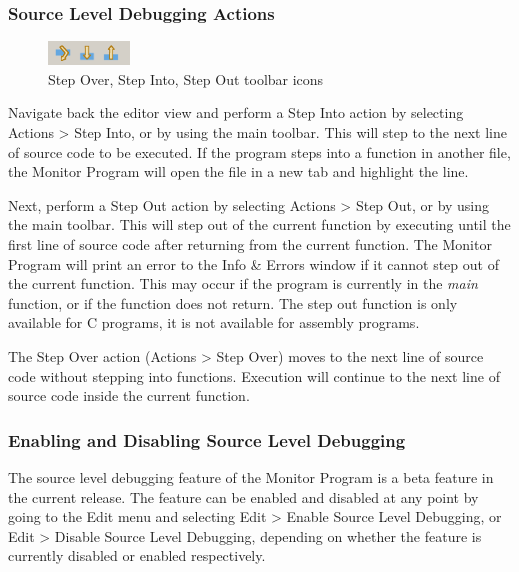 \documentclass[11pt, twoside, pdftex]{article}
\begin{document}
\subsubsection{Source Level Debugging Actions}

\begin{figure}[H]
   \begin{center}
      \includegraphics[scale=1]{screenshots/figure28.png}
   \end{center}
   \caption{Step Over, Step Into, Step Out toolbar icons}
	 \label{fig:28}
\end{figure}

Navigate back the editor view and perform a Step Into action by selecting {\sf Actions > Step Into}, or by using the main toolbar.
This will step to the next line of source code to be executed. If the program steps into a function in another file, the Monitor
Program will open the file in a new tab and highlight the line.

Next, perform a Step Out action by selecting {\sf Actions > Step Out}, or by using the main toolbar. This will step out of the current function 
by executing until the first line of source code after returning from the current function. The Monitor Program will print an error to the
{\sf Info \& Errors} window if it cannot step out of the current function. This may occur if the program is currently in the
{\it main} function, or if the function does not return. 
The step out function is only available for C programs, it is not available for assembly programs.

The Step Over action ({\sf Actions > Step Over}) moves to the next line of source code without stepping into functions. 
Execution will continue to the next line of source code inside the current function.

\subsubsection{Enabling and Disabling Source Level Debugging}
The source level debugging feature of the Monitor Program is a beta feature in the current release. The feature can be enabled and disabled at any point by going to the {\sf Edit} menu and selecting {\sf Edit > Enable Source Level Debugging}, or {\sf Edit > Disable Source Level Debugging}, depending on whether the feature is currently disabled or enabled respectively.
\end{document}
